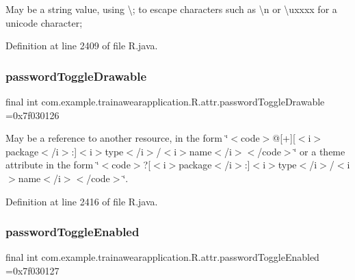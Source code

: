 May be a string value, using \textquotesingle{}\textbackslash{};\textquotesingle{} to escape characters such as \textquotesingle{}\textbackslash{}n\textquotesingle{} or \textquotesingle{}\textbackslash{}uxxxx\textquotesingle{} for a unicode character; 

Definition at line 2409 of file R.\+java.

\mbox{\label{classcom_1_1example_1_1trainawearapplication_1_1_r_1_1attr_afbb0722c6966ebc5fddb5e4b00d10d80}} 
\subsubsection{\texorpdfstring{passwordToggleDrawable}{passwordToggleDrawable}}
{\footnotesize\ttfamily final int com.\+example.\+trainawearapplication.\+R.\+attr.\+password\+Toggle\+Drawable =0x7f030126\hspace{0.3cm}{\ttfamily [static]}}

May be a reference to another resource, in the form \char`\"{}$<$code$>$@\mbox{[}+\mbox{]}\mbox{[}$<$i$>$package$<$/i$>$\+:\mbox{]}$<$i$>$type$<$/i$>$/$<$i$>$name$<$/i$>$$<$/code$>$\char`\"{} or a theme attribute in the form \char`\"{}$<$code$>$?\mbox{[}$<$i$>$package$<$/i$>$\+:\mbox{]}$<$i$>$type$<$/i$>$/$<$i$>$name$<$/i$>$$<$/code$>$\char`\"{}. 

Definition at line 2416 of file R.\+java.

\mbox{\label{classcom_1_1example_1_1trainawearapplication_1_1_r_1_1attr_ae696d0e29f8d20e72b292fca840957ac}} 
\subsubsection{\texorpdfstring{passwordToggleEnabled}{passwordToggleEnabled}}
{\footnotesize\ttfamily final int com.\+example.\+trainawearapplication.\+R.\+attr.\+password\+Toggle\+Enabled =0x7f030127\hspace{0.3cm}{\ttfamily [static]}}

